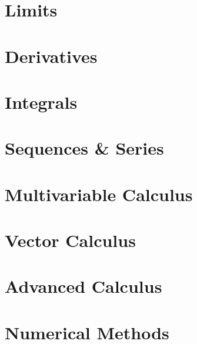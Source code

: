
\section{Limits}

\section{Derivatives}

\section{Integrals}

\section{Sequences \& Series}

\section{Multivariable Calculus}

\section{Vector Calculus}

\section{Advanced Calculus}

\section{Numerical Methods}
